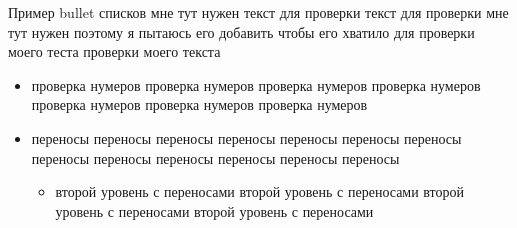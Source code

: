 \documentclass[../template.tex]{subfiles}
\begin{document}
	Пример bullet списков мне тут нужен текст для проверки текст для проверки мне тут нужен поэтому я пытаюсь его добавить чтобы его хватило для проверки моего теста проверки моего текста
	\begin{itemize}
		\item проверка нумеров проверка нумеров проверка нумеров проверка нумеров проверка нумеров проверка нумеров проверка нумеров 
		\item переносы переносы переносы переносы переносы переносы переносы переносы переносы переносы переносы переносы переносы
		\begin{itemize}
			\item второй уровень с переносами второй уровень с переносами второй уровень с переносами второй уровень с переносами
		\end{itemize}
	\end{itemize}
	
	
\end{document}
